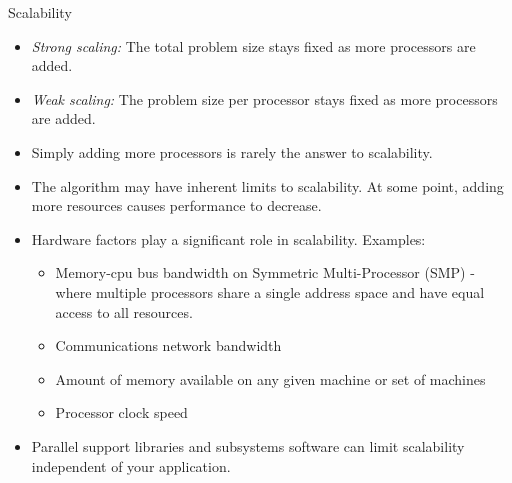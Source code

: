 \documentclass[10pt,times]{beamer}
\begin{document}
\begin{frame}{Scalability}
\begin{itemize}
\item \textit{Strong scaling:} The total problem size stays fixed as more processors 
are added. 
\item \textit{Weak scaling:} The problem size per processor stays fixed as more 
processors are added. 

\item Simply adding more processors is rarely the answer to scalability.

\item The algorithm may have inherent limits to scalability. At some point, adding 
more resources causes performance to decrease. 

\item Hardware factors play a significant role in scalability. Examples:

\begin{itemize}
\item Memory-cpu bus bandwidth on Symmetric Multi-Processor (SMP) -
    where multiple processors share a single 
    address space and have equal access to all resources. 
\item Communications network bandwidth
\item Amount of memory available on any given machine or set of machines
\item Processor clock speed 
\end{itemize}

\item Parallel support libraries and subsystems software can limit scalability 
independent of your application. 
\end{itemize}
\end{frame}

\end{document}
